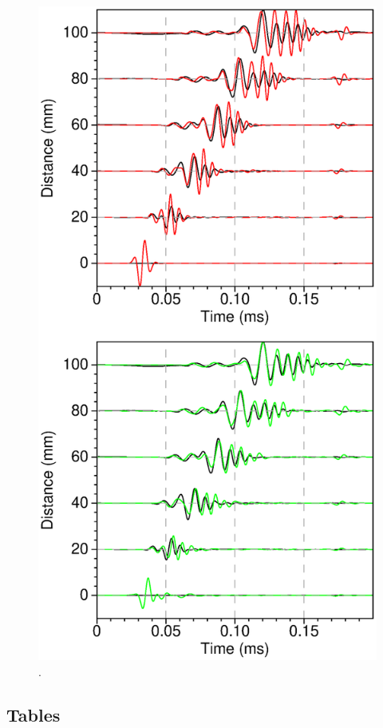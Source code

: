 \documentclass[manuscript,revised]{geophysics}
\begin{document}
\begin{figure}[!h]
	\centering
	\includegraphics[scale=0.5]{fig/blind-comp-cor.eps}
	\caption{.}
	\label{blind-test}
\end{figure}

\clearpage
\newpage

\subsection*{Tables}
\end{document}
